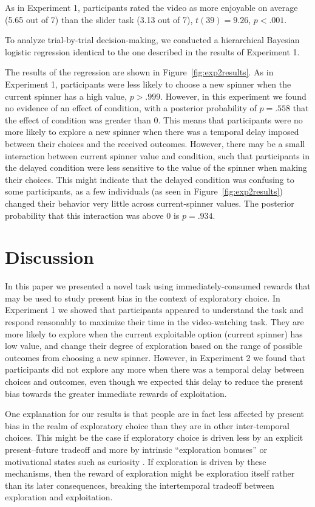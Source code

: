 \documentclass[10pt,letterpaper]{article}
\begin{document}
As in Experiment 1, participants rated the video as more enjoyable on average (5.65 out of 7) than the
slider task (3.13 out of 7), $t(39)=9.26$, $p<.001$.

To analyze trial-by-trial decision-making, we conducted a hierarchical Bayesian
logistic regression identical to the one described in the results of Experiment 1.

The results of the regression are shown in Figure~\ref{fig:exp2results}. As in Experiment 1,
participants were less likely to choose a new spinner when the current spinner
has a high value, $p>.999$. However, in this experiment we found no evidence of
an effect of condition, with a posterior probability of $p=.558$ that the effect of condition was
greater than 0. This means that participants were no more likely to explore a new spinner when there
was a temporal delay imposed between their choices and the received outcomes.
However, there may be a small interaction between current spinner value and
condition, such that participants in the delayed condition were less sensitive
to the value of the spinner when making their choices. This might indicate that
the delayed condition was confusing to some participants, as a few individuals
(as seen in Figure~\ref{fig:exp2results}) changed their behavior very little
across current-spinner values. The posterior probability that this interaction
was above 0 is $p=.934$.

\section{Discussion}

In this paper we presented a novel task using immediately-consumed rewards that
may be used to study present bias in the context of exploratory choice. In
Experiment 1 we showed that participants appeared to understand the task and
respond reasonably to maximize their time in the video-watching task. They are
more likely to explore when the current exploitable option (current spinner) has
low value, and change their degree of exploration based on the range of possible
outcomes from choosing a new spinner. However, in Experiment 2 we found that
participants did not explore any more when there was a temporal delay between
choices and outcomes, even though we expected this delay to reduce the present
bias towards the greater immediate rewards of exploitation.

One explanation for our results is that people are in fact less affected by
present bias in the realm of exploratory choice than they are in other
inter-temporal choices. This might be the case if exploratory choice is driven
less by an explicit present--future tradeoff and more by intrinsic ``exploration
bonuses'' \citep{kakade2002dopamine} or motivational states such as curiosity
\citep{Berlyne1966}. If exploration is driven by these mechanisms, then the
reward of exploration might be exploration itself rather than its later
consequences, breaking the intertemporal tradeoff between exploration and
exploitation.
\end{document}
